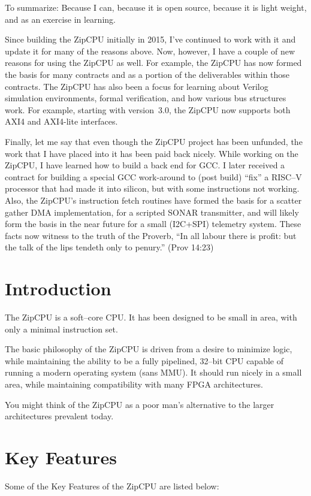 \documentclass{gqtekspec}
\begin{document}
\begin{preface}
To summarize: Because I can, because it is open source, because it is light
weight, and as an exercise in learning. 

Since building the ZipCPU initially in 2015, I've continued to work with it and
update it for many of the reasons above.  Now, however, I have a couple of new
reasons for using the ZipCPU as well.  For example, the ZipCPU has now formed
the basis for many contracts and as a portion of the deliverables within those
contracts.  The ZipCPU has also been a focus for learning about Verilog
simulation environments, formal verification, and how various bus structures
work.  For example, starting with version~3.0, the ZipCPU now supports
both AXI4 and AXI4-lite interfaces.

Finally, let me say that even though the ZipCPU project has been unfunded, the
work that I have placed into it has been paid back nicely.  While working on
the ZipCPU, I have learned how to build a back end for GCC.  I later received
a contract for building a special GCC work-around to (post build) ``fix'' a
RISC--V processor that had made it into silicon, but with some instructions
not working.  Also, the ZipCPU's instruction fetch routines have formed the
basis for a scatter gather DMA implementation, for a scripted SONAR
transmitter, and will likely form the basis in the near future for a small
(I2C+SPI) telemetry system.  These facts now witness to the truth of the
Proverb, ``In all labour there is profit: but the talk of the lips tendeth
only to penury.'' (Prov 14:23)
\end{preface}

\chapter{Introduction}
\setcounter{page}{1}

The ZipCPU is a soft--core CPU.  It has been designed to be small in area,
with only a minimal instruction set.

The basic philosophy of the ZipCPU is driven from a desire to minimize
logic, while maintaining the ability to be a fully pipelined, 32--bit
CPU capable of running a modern operating system (sans MMU).  It should run
nicely in a small area, while maintaining compatibility with many FPGA
architectures.

You might think of the ZipCPU as a poor man's alternative to the larger
architectures prevalent today.
\chapter{Key Features}\label{chap:features}
Some of the Key Features of the ZipCPU are listed below:
\end{document}
